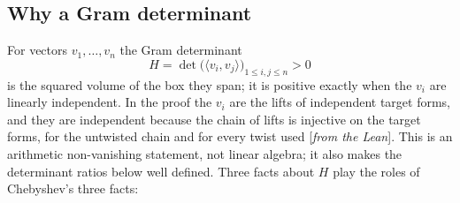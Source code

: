 \documentclass[11pt]{amsart}
\numberwithin{equation}{section}
\theoremstyle{definition}
\theoremstyle{remark}
\newcommand{\status}[1]{\textup{[\emph{#1}]}}
\begin{document}
\subsection*{Why a Gram determinant}
For vectors $v_1,\dots,v_n$ the Gram determinant
\begin{equation}
 H=\det\bigl(\langle v_i,v_j\rangle\bigr)_{1\le i,j\le n}>0
\end{equation}
is the squared volume of the box they span; it is positive exactly when the $v_i$ are linearly independent. In the proof the $v_i$ are the lifts of independent target forms, and they are independent because the chain of lifts is injective on the target forms, for the untwisted chain and for every twist used \status{from the Lean}. This is an arithmetic non-vanishing statement, not linear algebra; it also makes the determinant ratios below well defined. Three facts about $H$ play the roles of Chebyshev's three facts:
\end{document}
